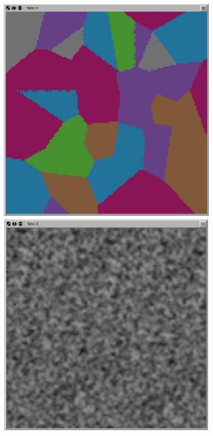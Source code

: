 \documentclass[conference]{IEEEtran}
\begin{document}
\begin{figure}[h]
\includegraphics[scale=0.25]{image/voronoi}
\includegraphics[scale=0.25]{image/perlin}

\end{figure}
\end{document}
